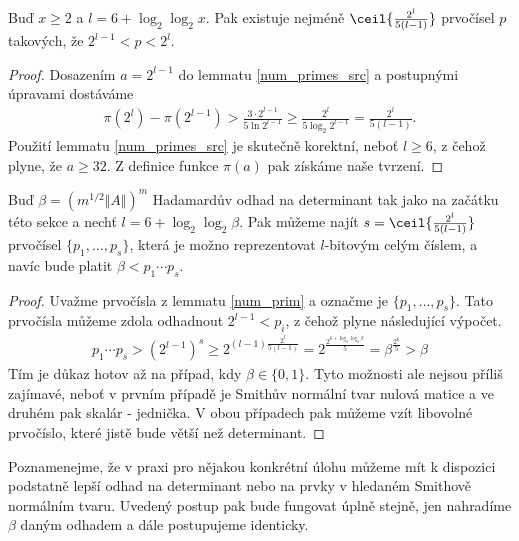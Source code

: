 \begin{lem} \label{num_prim}
Buď $ x \geq 2 $ a $ l = 6 + \log_2 \log_2 x $.
Pak existuje nejméně $ \ceil{\frac{2^{l}}{5 (l - 1)}} $ prvočísel $ p $
takových, že $ 2^{l - 1} < p < 2^l $.
\end{lem}
\begin{proof}
Dosazením $ a = 2^{l - 1} $ do lemmatu \ref{num_primes_src} a postupnými úpravami
dostáváme
\begin{align*}
    \pi(2^{l}) - \pi(2^{l - 1}) > \frac{3 \cdot 2^{l - 1}}{5 \ln{2^{l - 1}}}
                                \geq \frac{2^{l}}{5 \log_2{2^{l - 1}}}
                                = \frac{2^{l}}{5 (l - 1)}.
\end{align*}
Použití lemmatu \ref{num_primes_src} je skutečně korektní, neboť
$ l \geq 6 $, z čehož plyne, že $ a \geq 32 $. Z definice funkce $ \pi(a) $ pak
získáme naše tvrzení.
\end{proof}
\begin{dus}
Buď $ \beta = (m^{1/2} \Vert A \Vert )^m $ Hadamardův odhad na determinant tak
jako na začátku této sekce a nechť $ l = 6 + \log_2 \log_2 \beta $. Pak můžeme najít
$ s = \ceil{\frac{2^{l}}{5 (l - 1)}} $ prvočísel $ \{p_1, \dots, p_s\} $,
která je možno reprezentovat $ l $-bitovým celým číslem, a navíc bude platit
$ \beta < p_1 \cdots p_s $.
\end{dus}
\begin{proof}
Uvažme prvočísla z lemmatu \ref{num_prim} a označme je $ \{p_1, \dots, p_s\} $.
Tato prvočísla můžeme zdola odhadnout $ 2^{l - 1} < p_i $,
z čehož plyne následující výpočet.
\begin{align*}
    p_1 \cdots p_s
        > (2^{l - 1}) ^ s
        \geq 2^{(l - 1) \frac{2^l}{5 (l - 1)}}
        = 2^{\frac{2^{6 + \log_2 \log_2 \beta}}{5}}
        = \beta^{\frac{2^6}{5}} > \beta
\end{align*}
Tím je důkaz hotov až na případ, kdy $ \beta \in \{0, 1\} $. Tyto možnosti ale
nejsou příliš zajímavé, neboť v prvním případě je Smithův normální tvar nulová
matice a ve druhém pak skalár - jednička. V obou případech pak můžeme vzít
libovolné prvočíslo, které jistě bude větší než determinant.
\end{proof}

\begin{pozn}
Poznamenejme, že v praxi pro nějakou konkrétní úlohu můžeme mít k dispozici
podstatně lepší odhad na determinant nebo na prvky v hledaném Smithově normálním
tvaru. Uvedený postup pak bude fungovat úplně stejně, jen nahradíme $ \beta $
daným odhadem a dále postupujeme identicky.
\end{pozn}

